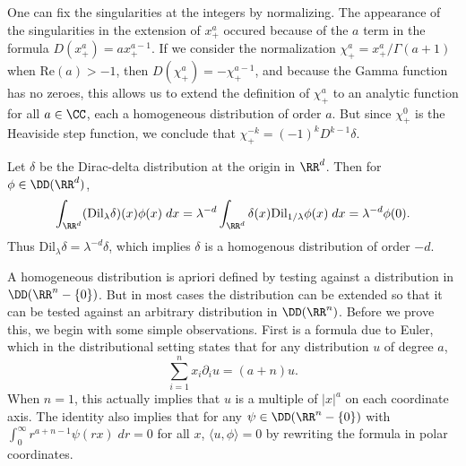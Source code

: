 \begin{example}
    One can fix the singularities at the integers by normalizing. The appearance of the singularities in the extension of $x^a_+$ occured because of the $a$ term in the formula $D(x^a_+) = a x^{a-1}_+$. If we consider the normalization $\chi^a_+ = x^a_+ / \Gamma(a+1)$ when $\text{Re}(a) > -1$, then $D(\chi^a_+) = - \chi^{a-1}_+$, and because the Gamma function has no zeroes, this allows us to extend the definition of $\chi^a_+$ to an analytic function for all $a \in \CC$, each a homogeneous distribution of order $a$. But since $\chi^0_+$ is the Heaviside step function, we conclude that $\chi_+^{-k} = (-1)^k D^{k-1} \delta$.
\end{example}

\begin{example}
  Let $\delta$ be the Dirac-delta distribution at the origin in $\RR^d$. Then for $\phi \in \DD(\RR^d)$,
  \begin{align*}
    \int_{\RR^d} (\text{Dil}_\lambda \delta)(x) \phi(x)\; dx = \lambda^{-d} \int_{\RR^d} \delta(x) \text{Dil}_{1/\lambda} \phi(x)\; dx = \lambda^{-d} \phi(0).
  \end{align*}
  Thus $\text{Dil}_\lambda \delta = \lambda^{-d} \delta$, which implies $\delta$ is a homogenous distribution of order $-d$.
\end{example}

A homogeneous distribution is apriori defined by testing against a distribution in $\DD(\RR^n - \{ 0 \})$. But in most cases the distribution can be extended so that it can be tested against an arbitrary distribution in $\DD(\RR^n)$. Before we prove this, we begin with some simple observations. First is a formula due to Euler, which in the distributional setting states that for any distribution $u$ of degree $a$,
%
\[ \sum_{i = 1}^n x_i \partial_i u = (a + n) u. \]
%
When $n = 1$, this actually implies that $u$ is a multiple of $|x|^a$ on each coordinate axis. The identity also implies that for any $\psi \in \DD(\RR^n - \{ 0 \})$ with $\int_0^\infty r^{a + n-1} \psi(rx)\; dr = 0$ for all $x$, $\langle u, \phi \rangle = 0$ by rewriting the formula in polar coordinates.

